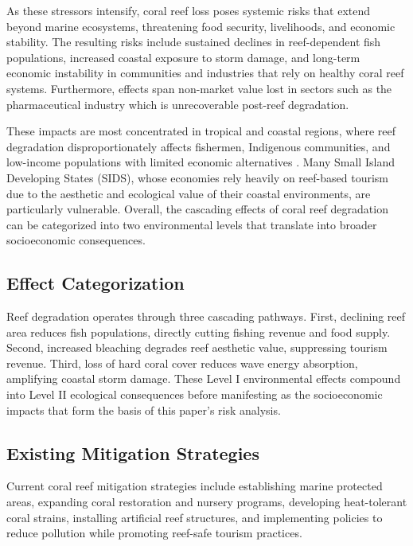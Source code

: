 \documentclass[10pt,letterpaper]{article}
\begin{document}
As these stressors intensify, coral reef loss poses systemic risks that extend beyond marine ecosystems, threatening food security, livelihoods, and economic stability. The resulting risks include sustained declines in reef-dependent fish populations, increased coastal exposure to storm damage, and long-term economic instability in communities and industries that rely on healthy coral reef systems. Furthermore, effects span non-market value lost in sectors such as the pharmaceutical industry which is unrecoverable post-reef degradation.

These impacts are most concentrated in tropical and coastal regions, where reef degradation disproportionately affects fishermen, Indigenous communities, and low-income populations with limited economic alternatives \cite{teicher_2025}. Many Small Island Developing States (SIDS), whose economies rely heavily on reef-based tourism due to the aesthetic and ecological value of their coastal environments, are particularly vulnerable. Overall, the cascading effects of coral reef degradation can be categorized into two environmental levels that translate into broader socioeconomic consequences.

\subsection{Effect Categorization}

Reef degradation operates through three cascading pathways. First, declining reef area reduces fish populations, directly cutting fishing revenue and food supply. Second, increased bleaching degrades reef aesthetic value, suppressing tourism revenue. Third, loss of hard coral cover reduces wave energy absorption, amplifying coastal storm damage. These Level I environmental effects compound into Level II ecological consequences before manifesting as the socioeconomic impacts that form the basis of this paper's risk analysis.

\subsection{Existing Mitigation Strategies}

Current coral reef mitigation strategies include establishing marine protected areas, expanding coral restoration and nursery programs, developing heat-tolerant coral strains, installing artificial reef structures, and implementing policies to reduce pollution while promoting reef-safe tourism practices. 
\end{document}
